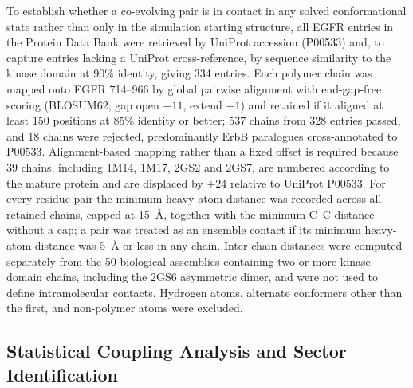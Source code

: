 \documentclass[utf8]{FrontiersinHarvard}
\begin{document}
To establish whether a co-evolving pair is in contact in any solved conformational state rather than only in the simulation starting structure, all EGFR entries in the Protein Data Bank were retrieved by UniProt accession (P00533) and, to capture entries lacking a UniProt cross-reference, by sequence similarity to the kinase domain at 90\% identity, giving 334 entries. Each polymer chain was mapped onto EGFR 714--966 by global pairwise alignment with end-gap-free scoring (BLOSUM62; gap open $-11$, extend $-1$) and retained if it aligned at least 150 positions at 85\% identity or better; 537 chains from 328 entries passed, and 18 chains were rejected, predominantly ErbB paralogues cross-annotated to P00533. Alignment-based mapping rather than a fixed offset is required because 39 chains, including 1M14, 1M17, 2GS2 and 2GS7, are numbered according to the mature protein and are displaced by $+24$ relative to UniProt P00533. For every residue pair the minimum heavy-atom distance was recorded across all retained chains, capped at 15~\AA{}, together with the minimum C\textalpha{}--C\textalpha{} distance without a cap; a pair was treated as an ensemble contact if its minimum heavy-atom distance was 5~\AA{} or less in any chain. Inter-chain distances were computed separately from the 50 biological assemblies containing two or more kinase-domain chains, including the 2GS6 asymmetric dimer, and were not used to define intramolecular contacts. Hydrogen atoms, alternate conformers other than the first, and non-polymer atoms were excluded.

\subsection{Statistical Coupling Analysis and Sector Identification}
\label{sec:scamethods}
\end{document}
